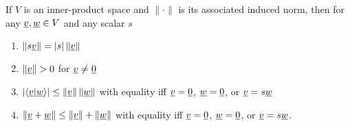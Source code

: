 \begin{theorem}
If $V$ is an inner-product space and $\| \cdot \|$ is its associated induced norm, then for any $\underline{v}, \underline{w} \in V$ and any scalar $s$
\begin{enumerate}
\item $\left\| s \underline{v} \right\| = |s| \left\| \underline{v} \right\|$
\item $\left\| \underline{v} \right\| > 0$ for $\underline{v} \neq \underline{0}$
\item $\left| \left\langle \underline{v} | \underline{w} \right\rangle \right| \leq \left\| \underline{v} \right\| \left\| \underline{w} \right\|$ with equality iff $\underline{v} = \underline{0}$, $\underline{w}=\underline{0}$, or $\underline{v} = s \underline{w}$
\item $\left\| \underline{v} + \underline{w} \right\| \leq \left\| \underline{v} \right\| + \left\| \underline{w} \right\|$ with equality iff $\underline{v} = \underline{0}$, $\underline{w}=\underline{0}$, or $\underline{v} = s \underline{w}$.
\end{enumerate}
\end{theorem}
